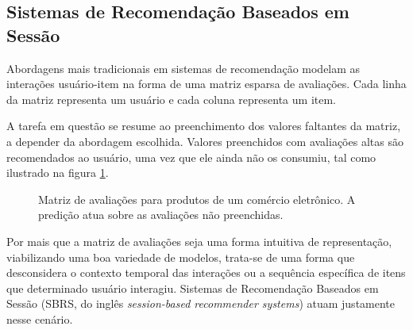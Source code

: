 \subsection{Sistemas de Recomendação Baseados em Sessão}

Abordagens mais tradicionais em sistemas de recomendação modelam as interações
usuário-item na forma de uma matriz esparsa de avaliações. Cada linha da matriz
representa um usuário e cada coluna representa um item.

A tarefa em questão se
resume ao preenchimento dos valores faltantes da matriz, a depender da
abordagem escolhida. Valores preenchidos com avaliações altas são recomendados
ao usuário, uma vez que ele ainda não os consumiu, tal como ilustrado
na figura \ref{fig:matriz_15}.


\begin{figure}[h]
    \centering
      \caption{Matriz de avaliações para produtos de um comércio eletrônico. A predição atua sobre as avaliações não preenchidas.}
      \label{fig:matriz_15}
\end{figure}

Por mais que a matriz de avaliações seja uma forma intuitiva de representação,
viabilizando uma boa variedade de modelos, trata-se de uma forma que
desconsidera o contexto temporal das interações ou a sequência específica de
itens que determinado usuário interagiu. Sistemas de Recomendação Baseados em
Sessão (SBRS, do inglês \textit{session-based recommender systems}) atuam
justamente nesse cenário.

